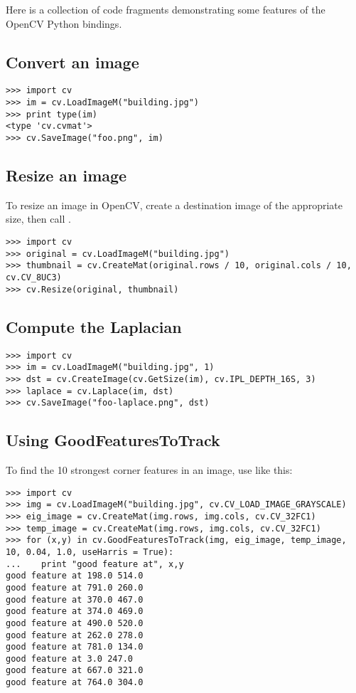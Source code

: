 Here is a collection of code fragments demonstrating some features
of the OpenCV Python bindings.

\subsection{Convert an image}

\begin{lstlisting}
>>> import cv
>>> im = cv.LoadImageM("building.jpg")
>>> print type(im)
<type 'cv.cvmat'>
>>> cv.SaveImage("foo.png", im)
\end{lstlisting}

\subsection{Resize an image}

To resize an image in OpenCV, create a destination image of the appropriate size, then call .

\begin{lstlisting}
>>> import cv
>>> original = cv.LoadImageM("building.jpg")
>>> thumbnail = cv.CreateMat(original.rows / 10, original.cols / 10, cv.CV_8UC3)
>>> cv.Resize(original, thumbnail)
\end{lstlisting}

\subsection{Compute the Laplacian}

\begin{lstlisting}
>>> import cv
>>> im = cv.LoadImageM("building.jpg", 1)
>>> dst = cv.CreateImage(cv.GetSize(im), cv.IPL_DEPTH_16S, 3)
>>> laplace = cv.Laplace(im, dst)
>>> cv.SaveImage("foo-laplace.png", dst)
\end{lstlisting}


\subsection{Using GoodFeaturesToTrack}

To find the 10 strongest corner features in an image, use  like this:

\begin{lstlisting}
>>> import cv
>>> img = cv.LoadImageM("building.jpg", cv.CV_LOAD_IMAGE_GRAYSCALE)
>>> eig_image = cv.CreateMat(img.rows, img.cols, cv.CV_32FC1)
>>> temp_image = cv.CreateMat(img.rows, img.cols, cv.CV_32FC1)
>>> for (x,y) in cv.GoodFeaturesToTrack(img, eig_image, temp_image, 10, 0.04, 1.0, useHarris = True):
...    print "good feature at", x,y
good feature at 198.0 514.0
good feature at 791.0 260.0
good feature at 370.0 467.0
good feature at 374.0 469.0
good feature at 490.0 520.0
good feature at 262.0 278.0
good feature at 781.0 134.0
good feature at 3.0 247.0
good feature at 667.0 321.0
good feature at 764.0 304.0
\end{lstlisting}


